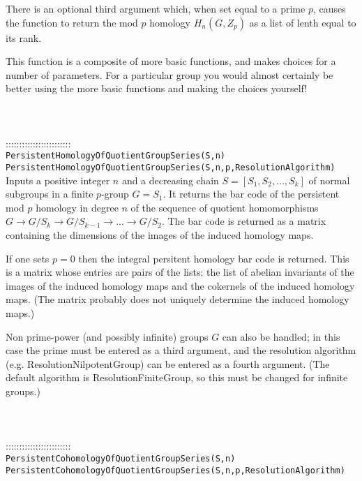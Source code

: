\documentclass[a4paper,11pt]{report}
\begin{document}
{ There is an optional third argument which, when set equal to a prime $p$, causes the function to return the mod $p$ homology $H_n(G,Z_p)$ as a list of lenth equal to its rank. 

 This function is a composite of more basic functions, and makes choices for a
number of parameters. For a particular group you would almost certainly be
better using the more basic functions and making the choices yourself! \\
 \\
 \\
 \\
 ::::::::::::::::::::::::\\
 \texttt{PersistentHomologyOfQuotientGroupSeries(S,n)}\\
 \texttt{PersistentHomologyOfQuotientGroupSeries(S,n,p,Resolution{\textunderscore}Algorithm)}\\
 

 Inputs a positive integer $n$ and a decreasing chain $S=[S_1, S_2, ..., S_k]$ of normal subgroups in a finite $p$-group $G=S_1$. It returns the bar code of the persistent mod $p$ homology in degree $n$ of the sequence of quotient homomorphisms $G \rightarrow G/S_k \rightarrow G/S_{k-1} \rightarrow ... \rightarrow G/S_2 $. The bar code is returned as a matrix containing the dimensions of the images
of the induced homology maps. 

 If one sets $p=0$ then the integral persitent homology bar code is returned. This is a matrix
whose entries are pairs of the lists: the list of abelian invariants of the
images of the induced homology maps and the cokernels of the induced homology
maps. (The matrix probably does not uniquely determine the induced homology
maps.) 

 Non prime-power (and possibly infinite) groups $G$ can also be handled; in this case the prime must be entered as a third
argument, and the resolution algorithm (e.g. ResolutionNilpotentGroup) can be
entered as a fourth argument. (The default algorithm is ResolutionFiniteGroup,
so this must be changed for infinite groups.) \\
 \\
 \\
 \\
 ::::::::::::::::::::::::\\
 \texttt{PersistentCohomologyOfQuotientGroupSeries(S,n)}\\
 \texttt{PersistentCohomologyOfQuotientGroupSeries(S,n,p,Resolution{\textunderscore}Algorithm)}\\
 

}
\end{document}
